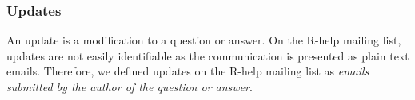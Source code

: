 \documentclass{sig-alternate-05-2015}
\begin{document}





\subsubsection{Updates}

	An update is a modification to a question or answer.
	On the R-help mailing list, updates are not easily identifiable as the communication is presented as plain text emails.
	Therefore, we defined updates on the R-help mailing list as \emph{emails submitted by the author of the question or answer}.
\end{document}
